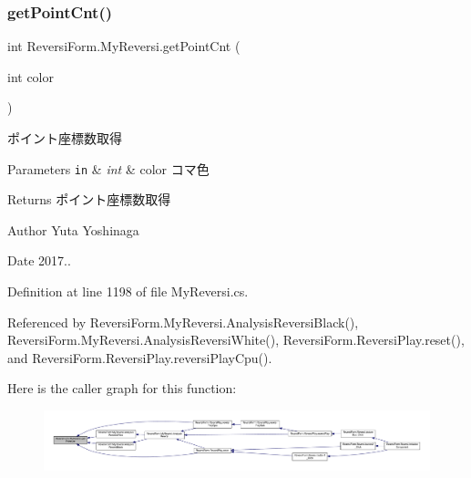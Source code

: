 \subsubsection{\texorpdfstring{get\+Point\+Cnt()}{getPointCnt()}}
{\footnotesize\ttfamily int Reversi\+Form.\+My\+Reversi.\+get\+Point\+Cnt (\begin{DoxyParamCaption}\item[{int}]{color }\end{DoxyParamCaption})}



ポイント座標数取得 


\begin{DoxyParams}[1]{Parameters}
\mbox{\tt in}  & {\em int} & color コマ色 \\
\hline
\end{DoxyParams}
\begin{DoxyReturn}{Returns}
ポイント座標数取得 
\end{DoxyReturn}
\begin{DoxyAuthor}{Author}
Yuta Yoshinaga 
\end{DoxyAuthor}
\begin{DoxyDate}{Date}
2017.. 
\end{DoxyDate}


Definition at line 1198 of file My\+Reversi.\+cs.



Referenced by Reversi\+Form.\+My\+Reversi.\+Analysis\+Reversi\+Black(), Reversi\+Form.\+My\+Reversi.\+Analysis\+Reversi\+White(), Reversi\+Form.\+Reversi\+Play.\+reset(), and Reversi\+Form.\+Reversi\+Play.\+reversi\+Play\+Cpu().

Here is the caller graph for this function\+:\nopagebreak
\begin{figure}[H]
\begin{center}
\leavevmode
\includegraphics[width=350pt]{class_reversi_form_1_1_my_reversi_a7b5ebbdd9b7ff56d72185e6b89a50af8_icgraph}
\end{center}
\end{figure}
\mbox{\label{class_reversi_form_1_1_my_reversi_a379ac04ab0e8e9fc819ef3ceeba63e58}} 
